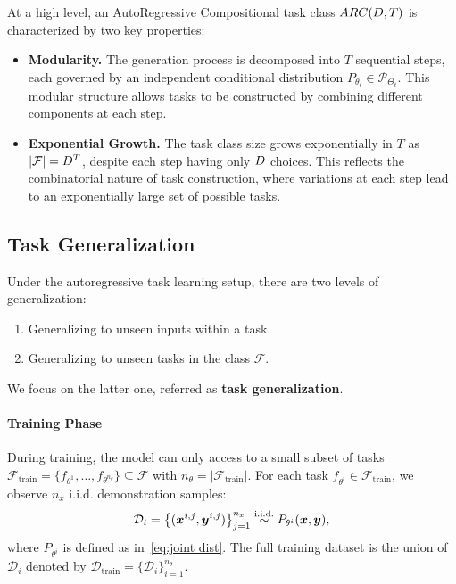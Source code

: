 At a high level, an AutoRegressive Compositional task class \( ARC(D, T) \) is characterized by two key properties:
\vspace{-2mm}
\begin{itemize}[leftmargin=0.4 cm]
    \item \textbf{Modularity.} The generation process is decomposed into \( T \) sequential steps, each governed by an independent conditional distribution \( P_{\theta_t} \in \mathcal{P}_{\Theta_t} \). This modular structure allows tasks to be constructed by combining different components at each step.
    
    \item \textbf{Exponential Growth.} The task class size grows exponentially in $T$ as $|\mathcal{F}| = D^T$, despite each step having only \(D\) choices. This reflects the combinatorial nature of task construction, where  variations at each step lead to an exponentially large set of possible tasks. 
\end{itemize}



\subsection{Task Generalization}\label{sec: task generalization}



Under the autoregressive task learning setup, there are two levels of generalization:
\vspace{-2mm}
\begin{enumerate}
    \item Generalizing to unseen inputs within a task.
    \item Generalizing to unseen tasks in the class $\mathcal{F}$.
\end{enumerate}
\vspace{-2mm}
We focus on the latter one, referred as \textbf{task generalization}.

\vspace{-2mm}
\paragraph{Training Phase} During training, the model can only access to a small subset of tasks 
$\mathcal{F}_{\mathrm{train}} = \{f_{\theta^1}, \dots, f_{\theta^{n_\theta}}\} \subseteq \mathcal{F}$ with $n_\theta = |\mathcal{F}_{\mathrm{train}}|$. For each task $f_{\theta^i} \in \mathcal{F}_{\mathrm{train}}$, we observe $n_x$ i.i.d. {demonstration samples}:
\[
\mathcal{D}_i = \left\{(\bm x^{i,j}, \bm y^{i,j})\right\}_{j=1}^{n_x} \overset{\text{i.i.d.}}{\sim} P_{\theta^i}(\bm{x}, \bm{y}),
\]
where $P_{\theta^i}$ is defined as in~\cref{eq:joint dist}. The full training dataset is the union of ${\mathcal{D}_i}$ denoted by $\mathcal{D}_{\mathrm{train}} = \{\mathcal{D}_i\}_{i=1}^{n_\theta}$.


